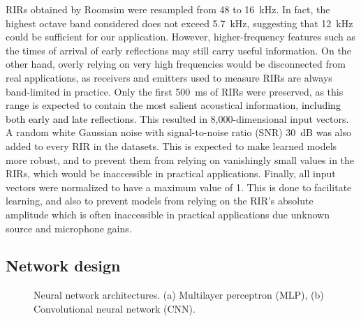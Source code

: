 \documentclass[reprint]{JASA}
\begin{document}
RIRs obtained by Roomsim were resampled from 48 to 16~kHz. In fact, the highest octave band considered does not exceed 5.7~kHz, suggesting that 12~kHz could be sufficient for our application. However, higher-frequency features such as the times of arrival of early reflections may still carry useful information. On the other hand, overly relying on very high frequencies would be disconnected from real applications, as receivers and emitters used to measure RIRs are always band-limited in practice. Only the first 500~ms of RIRs were preserved, as this range is expected to contain the most salient acoustical information, \textcolor{black}{including both early and late reflections}. This resulted in 8,000-dimensional input vectors. A random white Gaussian noise with signal-to-noise ratio (SNR) 30~dB was also added to every RIR in the datasets. This is expected to make learned models more robust, and to prevent them from relying on vanishingly small values in the RIRs, which would be inaccessible in practical applications. Finally, all input vectors were normalized to have a maximum value of 1. This is done to facilitate learning, and also to prevent models from relying on the RIR's absolute amplitude which is often inaccessible in practical applications due unknown source and microphone gains.

\subsection{Network design}
\label{subsec:architecture}

\begin{figure}[t!]
	\centering
	\caption{\label{fig:networks} Neural network architectures. (a) Multilayer perceptron (MLP), (b) Convolutional neural network (CNN).}
\end{figure}
\end{document}
